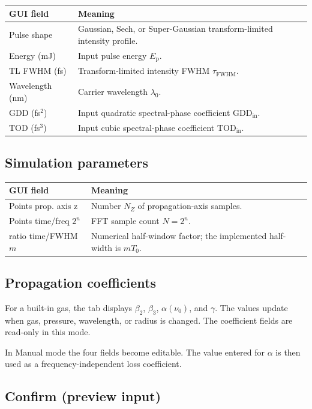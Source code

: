 \documentclass[11pt,a4paper]{article}
\newcommand{\GDD}{\mathrm{GDD}}
\newcommand{\TOD}{\mathrm{TOD}}
\newcommand{\FWHM}{\mathrm{FWHM}}
\begin{document}
\begin{longtable}{p{}p{}}
\toprule
\textbf{GUI field} & \textbf{Meaning}\\
\midrule
Pulse shape & Gaussian, Sech, or Super-Gaussian transform-limited intensity profile.\\
Energy (mJ) & Input pulse energy $E_{\mathrm p}$.\\
TL FWHM (fs) & Transform-limited intensity FWHM $\tau_{\FWHM}$.\\
Wavelength (nm) & Carrier wavelength $\lambda_0$.\\
GDD (fs$^2$) & Input quadratic spectral-phase coefficient $\GDD_{\mathrm{in}}$.\\
TOD (fs$^3$) & Input cubic spectral-phase coefficient $\TOD_{\mathrm{in}}$.\\
\bottomrule
\end{longtable}

\subsection{Simulation parameters}

\begin{longtable}{p{}p{}}
\toprule
\textbf{GUI field} & \textbf{Meaning}\\
\midrule
Points prop. axis z & Number $N_Z$ of propagation-axis samples.\\
Points time/freq $2^n$ & FFT sample count $N=2^n$.\\
ratio time/FWHM $m$ & Numerical half-window factor; the implemented half-width is $mT_0$.\\
\bottomrule
\end{longtable}

\subsection{Propagation coefficients}

For a built-in gas, the tab displays $\beta_2$, $\beta_3$, $\alpha(\nu_0)$,
and $\gamma$. The values update when gas, pressure, wavelength, or radius is
changed. The coefficient fields are read-only in this mode.

In Manual mode the four fields become editable. The value entered for $\alpha$
is then used as a frequency-independent loss coefficient.

\subsection{Confirm (preview input)}
\end{document}
